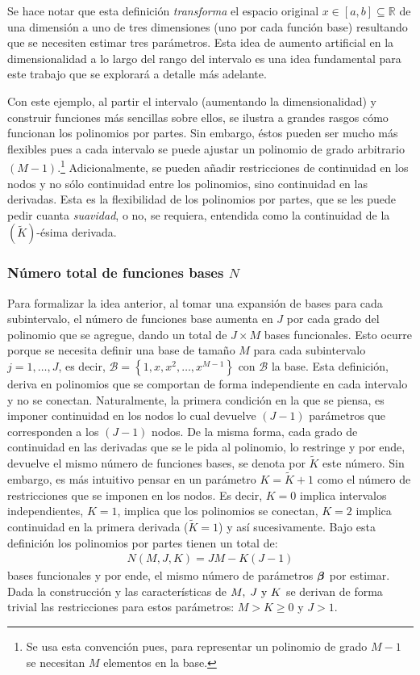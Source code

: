 \documentclass[../Main/Main.tex]{subfiles}
\begin{document}
Se hace notar que esta definición \emph{transforma} el espacio original $x\in[a,b]\subseteq\mathbb{R}$ de una dimensión a uno de tres dimensiones (uno por cada función base) resultando que se necesiten estimar tres parámetros. Esta idea de aumento artificial en la dimensionalidad a lo largo del rango del intervalo es una idea fundamental para este trabajo que se explorará a detalle más adelante.

Con este ejemplo, al partir el intervalo (aumentando la dimensionalidad) y construir funciones más sencillas sobre ellos, se ilustra a grandes rasgos cómo funcionan los polinomios por partes. Sin embargo, éstos pueden ser mucho más flexibles pues a cada intervalo se puede ajustar un polinomio de grado arbitrario $(M-1)$.\footnote{Se usa esta convención pues, para representar un polinomio de grado $M-1$ se necesitan $M$ elementos en la base.} Adicionalmente, se pueden añadir restricciones de continuidad en los nodos y no sólo continuidad entre los polinomios, sino continuidad en las derivadas. Esta es la flexibilidad de los polinomios por partes, que se les puede pedir cuanta \textit{suavidad}, o no, se requiera, entendida como la continuidad de la $(\tilde{K})$-ésima derivada. 

\subsubsection*{Número total de funciones bases $N$}
Para formalizar la idea anterior, al tomar una expansión de bases para cada subintervalo, el número de funciones base aumenta en $J$ por cada grado del polinomio que se agregue, dando un total de $J\times M$ bases funcionales. Esto ocurre porque se necesita definir una base de tamaño $M$ para cada subintervalo $j = 1,\ldots,J$, es decir, $\mathcal{B} = \left\{1,x,x^2,\ldots,x^{M-1}\right\}$ con $\mathcal{B}$ la base. Esta definición, deriva en polinomios que se comportan de forma independiente en cada intervalo y no se conectan. Naturalmente, la primera condición en la que se piensa, es imponer continuidad en los nodos lo cual devuelve $(J-1)$ parámetros que corresponden a los $(J-1)$ nodos. De la misma forma, cada grado de continuidad en las derivadas que se le pida al polinomio, lo restringe y por ende, devuelve el mismo número de funciones bases, se denota por $\tilde{K}$ este número. Sin embargo, es más intuitivo pensar en un parámetro $K = \tilde{K} + 1$ como el número de restricciones que se imponen en los nodos. Es decir, $K = 0$ implica intervalos independientes, $K = 1$, implica que los polinomios se conectan, $K = 2$ implica continuidad en la primera derivada ($\tilde{K} = 1$) y así sucesivamente. Bajo esta definición los polinomios por partes tienen un total de:
\begin{align}
	N(M,J,K) = JM - K(J-1) \label{ec:NEstrella}
\end{align}
bases funcionales y por ende, el mismo número de parámetros $\bm{\beta}$ por estimar. Dada la construcción y las características de $M,\;J\text{ y }K$ se derivan de forma trivial las restricciones para estos parámetros: $M > K \geq 0 $ y $J > 1$.
\end{document}
